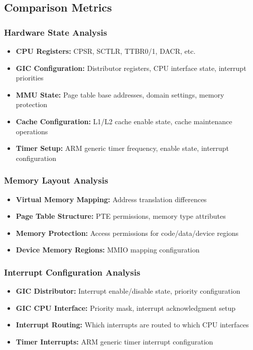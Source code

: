 \documentclass[11pt,a4paper]{article}
\begin{document}
\subsection{Comparison Metrics}

\subsubsection{Hardware State Analysis}
\begin{itemize}
    \item \textbf{CPU Registers:} CPSR, SCTLR, TTBR0/1, DACR, etc.
    \item \textbf{GIC Configuration:} Distributor registers, CPU interface state, interrupt priorities
    \item \textbf{MMU State:} Page table base addresses, domain settings, memory protection
    \item \textbf{Cache Configuration:} L1/L2 cache enable state, cache maintenance operations
    \item \textbf{Timer Setup:} ARM generic timer frequency, enable state, interrupt configuration
\end{itemize}

\subsubsection{Memory Layout Analysis}
\begin{itemize}
    \item \textbf{Virtual Memory Mapping:} Address translation differences
    \item \textbf{Page Table Structure:} PTE permissions, memory type attributes
    \item \textbf{Memory Protection:} Access permissions for code/data/device regions
    \item \textbf{Device Memory Regions:} MMIO mapping configuration
\end{itemize}

\subsubsection{Interrupt Configuration Analysis}
\begin{itemize}
    \item \textbf{GIC Distributor:} Interrupt enable/disable state, priority configuration
    \item \textbf{GIC CPU Interface:} Priority mask, interrupt acknowledgment setup
    \item \textbf{Interrupt Routing:} Which interrupts are routed to which CPU interfaces
    \item \textbf{Timer Interrupts:} ARM generic timer interrupt configuration
\end{itemize}
\end{document}
